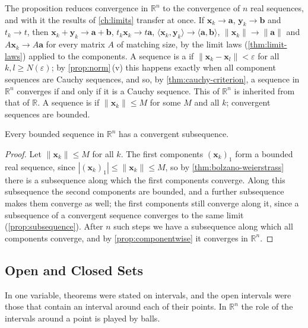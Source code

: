 The proposition reduces convergence in $\mathbb R^n$ to the convergence of $n$ real sequences, and with it the results of \cref{ch:limits} transfer at once. If $\mathbf x_k\to\mathbf a$, $\mathbf y_k\to\mathbf b$ and $t_k\to t$, then $\mathbf x_k+\mathbf y_k\to\mathbf a+\mathbf b$, $t_k\mathbf x_k\to t\mathbf a$, $\langle\mathbf x_k,\mathbf y_k\rangle\to\langle\mathbf a,\mathbf b\rangle$, $\|\mathbf x_k\|\to\|\mathbf a\|$ and $A\mathbf x_k\to A\mathbf a$ for every matrix $A$ of matching size, by the limit laws (\cref{thm:limit-laws}) applied to the components. A sequence is a  if $\|\mathbf x_k-\mathbf x_l\|<\varepsilon$ for all $k,l\ge N(\varepsilon)$; by \cref{prop:norm}\,(v) this happens exactly when all component sequences are Cauchy sequences, and so, by \cref{thm:cauchy-criterion}, a sequence in $\mathbb R^n$ converges if and only if it is a Cauchy sequence. This  of $\mathbb R^n$ is inherited from that of $\mathbb R$. A sequence is  if $\|\mathbf x_k\|\le M$ for some $M$ and all $k$; convergent sequences are bounded.

\begin{theorem}
\label{thm:bolzano-weierstrass-rn}
Every bounded sequence in $\mathbb R^n$ has a convergent subsequence.
\end{theorem}

\begin{proof}
Let $\|\mathbf x_k\|\le M$ for all $k$. The first components $(\mathbf x_k)_1$ form a bounded real sequence, since $|(\mathbf x_k)_1|\le\|\mathbf x_k\|\le M$, so by \cref{thm:bolzano-weierstrass} there is a subsequence along which the first components converge. Along this subsequence the second components are bounded, and a further subsequence makes them converge as well; the first components still converge along it, since a subsequence of a convergent sequence converges to the same limit (\cref{prop:subsequence}). After $n$ such steps we have a subsequence along which all components converge, and by \cref{prop:componentwise} it converges in $\mathbb R^n$.
\end{proof}

\subsection{Open and Closed Sets}

In one variable, theorems were stated on intervals, and the open intervals were those that contain an interval around each of their points. In $\mathbb R^n$ the role of the intervals around a point is played by balls.

